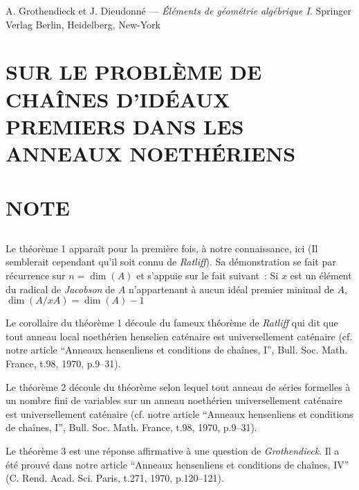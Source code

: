 {{\begin{thebibliography}{99}
  {\sc A. Grothendieck et J. Dieudonné} ---
  {\it Éléments de géométrie algébrique I}. Springer Verlag Berlin, Heidelberg, New-York

\end{thebibliography}

\chapter*{SUR LE PROBLÈME DE CHAÎNES D’IDÉAUX PREMIERS DANS LES ANNEAUX NOETHÉRIENS}\thispagestyle{empty}
\label{sec:b}
\section*{}

\chapter*{NOTE}\thispagestyle{empty}
\label{sec:n2}
\section*{}

Le théorème 1 apparaît pour la première fois, à notre connaissance, ici (Il semblerait cependant qu’il soit connu de \emph{Ratliff}). Sa démonstration se fait par récurrence sur $n = \dim(A)$ et s’appuie sur le fait suivant~: Si $x$ est un élément du radical de \emph{Jacobson} de $A$ n’appartenant à aucun idéal premier minimal de $A$, $\dim(A / xA) = \dim(A) - 1$

Le corollaire du théorème 1 découle du fameux théorème de \emph{Ratliff} qui dit que tout anneau local noethérien henselien caténaire est universellement caténaire (cf. notre article ``Anneaux hensenliens et conditions de chaînes, I'', Bull. Soc. Math.  France, t.98, 1970, p.9–31).

Le théorème 2 découle du théorème selon lequel tout anneau de séries formelles à un nombre fini de variables sur un anneau noethérien universellement caténaire est universellement caténaire (cf. notre article ``Anneaux hensenliens et conditions de chaînes, I'', Bull. Soc. Math. France, t.98, 1970, p.9–31).

Le théorème 3 est une réponse affirmative à une question de \emph{Grothendieck}. Il a été prouvé dans notre article ``Anneaux hensenliens et conditions de chaînes, IV'' (C. Rend. Acad. Sci. Paris, t.271, 1970, p.120–121).

}}
